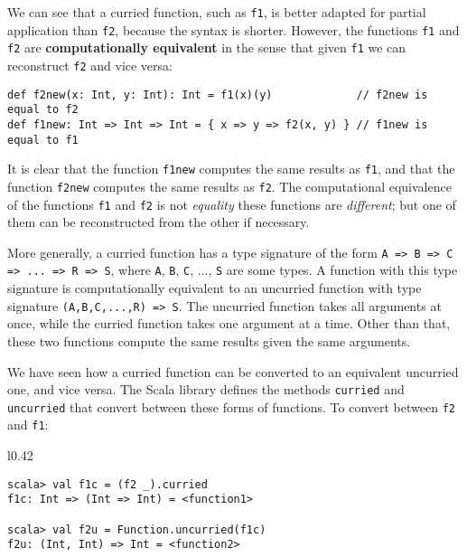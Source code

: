 We can see that a curried function, such as \lstinline!f1!, is better
adapted for partial application than \lstinline!f2!, because the
syntax is shorter. However, the functions \lstinline!f1! and \lstinline!f2!
are \textbf{computationally equivalent}
in the sense that given \lstinline!f1! we can reconstruct \lstinline!f2!
and vice versa:
\begin{lstlisting}
def f2new(x: Int, y: Int): Int = f1(x)(y)             // f2new is equal to f2
def f1new: Int => Int => Int = { x => y => f2(x, y) } // f1new is equal to f1
\end{lstlisting}
It is clear that the function \lstinline!f1new! computes the same
results as \lstinline!f1!, and that the function \lstinline!f2new!
computes the same results as \lstinline!f2!. The computational equivalence
of the functions \lstinline!f1! and \lstinline!f2! is not \emph{equality}
 \textemdash{} these functions are \emph{different}; but one of them
can be reconstructed from the other if necessary. 

More generally, a curried function has a type signature of the form
\lstinline!A => B => C => ... => R => S!, where \lstinline!A!, \lstinline!B!,
\lstinline!C!, ..., \lstinline!S! are some types. A function with
this type signature is computationally equivalent to an uncurried
function with type signature \lstinline!(A,B,C,...,R) => S!. The
uncurried function takes all arguments at once, while the curried
function takes one argument at a time. Other than that, these two
functions compute the same results given the same arguments.

We have seen how a curried function can be converted to an equivalent
uncurried one, and vice versa. The Scala library defines the methods
\lstinline!curried! and \lstinline!uncurried! that convert between
these forms of functions. To convert between \lstinline!f2! and \lstinline!f1!:

\begin{wrapfigure}{l}{0.42\columnwidth}%
\vspace{-0.9\baselineskip}
\begin{lstlisting}
scala> val f1c = (f2 _).curried
f1c: Int => (Int => Int) = <function1>

scala> val f2u = Function.uncurried(f1c)
f2u: (Int, Int) => Int = <function2> 
\end{lstlisting}
\vspace{-0.95\baselineskip}
\end{wrapfigure}%

